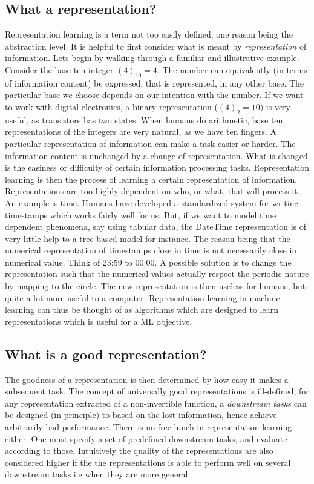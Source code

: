\documentclass[../../thesis.tex]{subfiles}
\begin{document}
\subsection{What a representation?}

Representation learning is a term not too easily defined, one reason being the abstraction level. It is helpful to first consider what is meant by \textit{representation} of information. Lets begin by walking through a familiar and illustrative example. Consider the base ten integer $(4)_{10} = 4$. The number can equivalently (in terms of information content) be expressed, that is represented, in any other base. The particular base we choose depends on our intention with the number. If we want to work with digital electronics, a binary representation ($(4)_{2} = 10$) is very useful, as transistors has two states. When humans do arithmetic, base ten representations of the integers are very natural, as we have ten fingers. A particular representation of information can make a task easier or harder. The information content is unchanged by a change of representation. What is changed is the easiness or difficulty of certain information processing tasks. Representation learning is then the process of learning a certain representation of information. \newline
Representations are too highly dependent on who, or what, that will process it. An example is time. Humans have developed a standardized system for writing timestamps which works fairly well for us. But, if we want to model time dependent phenomena, say using tabular data, the DateTime representation is of very little help to a tree based model for instance. The reason being that the numerical representation of timestamps close in time is not necessarily close in numerical value. Think of 23:59 to 00:00. A possible solution is to change the representation such that the numerical values actually respect the periodic nature by mapping to the circle. The new representation is then useless for humans, but quite a lot more useful to a computer. Representation learning in machine learning can thus be thought of as algorithms which are designed to learn representations which is useful for a ML objective.

\subsection{What is a good representation?}

The goodness of a representation is then determined by how easy it makes a subsequent task. The concept of universally good representations is ill-defined, for any representation extracted of a non-invertible function, a \textit{downstream tasks} can be designed (in principle) to based on the lost information, hence achieve arbitrarily bad performance. There is no free lunch in representation learning either. One must specify a set of predefined downstream tasks, and evaluate according to those. Intuitively the quality of the representations are also considered higher if the the representations is able to perform well on several downstream tasks i.e when they are more general. 
\end{document}
